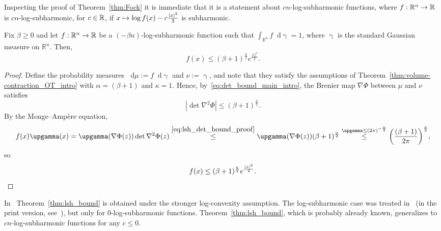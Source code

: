 \documentclass[AHL,Unicode,longabstracts]{cedram}
\newcommand{\R}{\mathbb R}
\newcommand{\dd}{n}
\newcommand{\conv}{c}
\newcommand{\density}{f}
\newcommand{\source}{\mu}
\newcommand{\target}{\nu}
\newcommand{\lsh}{\alpha}
\newcommand{\lc}{\kappa}
\newcommand*\diff{\mathop{}\!\mathrm{d}}
\newcommand{\Gaussian}{\upgamma}
\newcommand{\OT}{\Phi}
\renewcommand*{\to}{\mathchoice{\longrightarrow}{\rightarrow}{\rightarrow}{\rightarrow}}
\let\oldmapsto\mapsto
\renewcommand*{\mapsto}{\mathchoice{\longmapsto}{\oldmapsto}{\oldmapsto}{\oldmapsto}}
\let\originalleft\left
\let\originalright\right
\renewcommand{\left}{\mathopen{}\mathclose\bgroup\originalleft}
\renewcommand{\right}{\aftergroup\egroup\originalright}
\let\oldin\in
\renewcommand{\in}{\mathchoice{\oldin}{\oldin}{\,\oldin\,}{\,\oldin\,}}
\begin{document}
Inspecting the proof of Theorem~\ref{thm:Fock} it is immediate that it is a statement about $\conv\dd$-log-subharmonic functions, where $\density:\R^{\dd}\to\R$ is $\conv\dd$-log-subharmonic, for $\conv\in \R$, if $x\mapsto \log f(x)-\conv\frac{|x|^2}{2}$ is subharmonic.

\begin{theo}\label{thm:lsh_bound}
Fix $\beta\ge 0$ and let $\density:\R^{\dd}\to\R$ be a $(-\beta\dd)$-log-subharmonic function such that $\int_{\R^{\dd}}\density \diff\Gaussian=1$, where $\Gaussian$ is the standard Gaussian measure on $\R^{\dd}$. Then,
\begin{equation}\label{eq:lsh_bound}
f(x)\le (\beta+1)^{\frac{\dd}{2}}e^{\frac{|x|^2}{2}}.
\end{equation}
\end{theo}
\begin{proof}
Define the probability measures $\diff\source:=\density\diff\Gaussian$ and $\target:=\Gaussian$, and note that they satisfy the assumptions of Theorem~\ref{thm:volume-contraction_OT_intro} with $\lsh=(\beta+1)$ and $\lc=1$. Hence, by~\eqref{eq:det_bound_main_intro}, the Brenier map $\nabla\OT$ between $\source$ and $\target$ satisfies
\begin{equation}\label{eq:lsh_det_bound_proof}
|\det\nabla^2\OT|\le (\beta+1)^{\frac{\dd}{2}}.
\end{equation}
By the Monge--Ampère equation,
\begin{align*}
\density(x)\Gaussian(x)= \Gaussian(\nabla\OT(z))\det\nabla^2\OT(z)\overset{\eqref{eq:lsh_det_bound_proof}}{\le } \Gaussian(\nabla\OT(z))(\beta+1)^{\frac{\dd}{2}}\overset{\Gaussian\le (2\pi)^{-\frac{\dd}{2}}}{\le} \left(\frac{(\beta+1)}{2\pi}\right)^{\frac{\dd}{2}},
\end{align*}
so
\[
f(x)\le (\beta+1)^{\frac{\dd}{2}}e^{\frac{|x|^2}{2}}.\qedhere
\]
\end{proof}

In~\cite[Lemma~2.1]{MR3723580} Theorem~\ref{thm:lsh_bound} is obtained under the stronger log-convexity assumption. The log-subharmonic case was treated in~\cite{MR2578455} (in the print version, see~\cite[Remark~2.2]{MR3723580}), but only for $0$-log-subharmonic functions. Theorem~\ref{thm:lsh_bound}, which is probably already known, generalizes to $\conv\dd$-log-subharmonic functions for any $\conv\le 0$.
\end{document}
